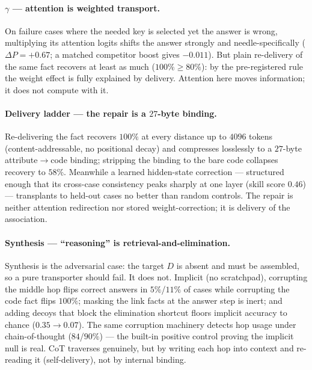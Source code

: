 \documentclass[11pt]{article}
\begin{document}
\paragraph{$\gamma$ --- attention is weighted transport.} On failure cases where the
needed key is selected yet the answer is wrong, multiplying its attention logits shifts
the answer strongly and needle-specifically ($\Delta P=+0.67$; a matched competitor
boost gives $-0.011$). But plain re-delivery of the same fact recovers at least as much
($100\%\ge80\%$): by the pre-registered rule the weight effect is fully explained by
delivery. Attention here moves information; it does not compute with it.

\paragraph{Delivery ladder --- the repair is a $27$-byte binding.} Re-delivering the
fact recovers $100\%$ at every distance up to $4096$ tokens (content-addressable, no
positional decay) and compresses losslessly to a $27$-byte attribute$\to$code binding;
stripping the binding to the bare code collapses recovery to $58\%$. Meanwhile a
learned hidden-state correction --- structured enough that its cross-case consistency
peaks sharply at one layer (skill score $0.46$) --- transplants to held-out cases no
better than random controls. The repair is neither attention redirection nor stored
weight-correction; it is delivery of the association.

\paragraph{Synthesis --- ``reasoning'' is retrieval-and-elimination.} Synthesis is the
adversarial case: the target $D$ is absent and must be assembled, so a pure transporter
should fail. It does not. Implicit (no scratchpad), corrupting the middle hop flips
correct answers in $5\%$/$11\%$ of cases while corrupting the code fact flips $100\%$;
masking the link facts at the answer step is inert; and adding decoys that block the
elimination shortcut floors implicit accuracy to chance ($0.35\!\to\!0.07$). The same
corruption machinery detects hop usage under chain-of-thought ($84$/$90\%$) --- the
built-in positive control proving the implicit null is real. CoT traverses genuinely,
but by writing each hop into context and re-reading it (self-delivery), not by internal
binding.
\end{document}
